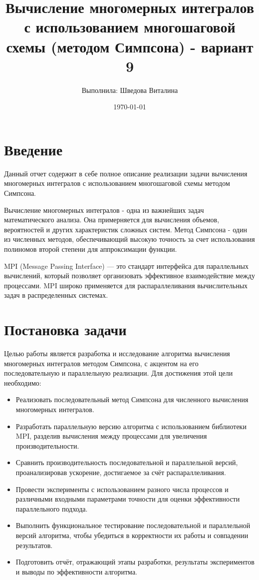 \documentclass[12pt]{article}
\title{Вычисление многомерных интегралов с использованием многошаговой схемы (методом Симпсона) - вариант 9}
\author{Выполнила: Шведова Виталина }
\date{\today}
\begin{document}
\sloppy

\maketitle

\tableofcontents
\newpage

\section*{Введение}

Данный отчет содержит в себе полное описание реализации задачи вычисления многомерных интегралов с использованием многошаговой схемы методом Симпсона.

Вычисление многомерных интегралов - одна из важнейших задач математического анализа. Она примерняется для вычисления объемов, вероятностей и других характеристик сложных систем. Метод Симпсона - один из численных методов, обеспечивающий высокую точность за счет использования полиномов второй степени для аппроксимации функции.

MPI (Message Passing Interface) — это стандарт интерфейса для параллельных вычислений, который позволяет организовать эффективное взаимодействие между процессами. MPI широко применяется для распараллеливания вычислительных задач в распределенных системах.

\section*{Постановка задачи}
Целью работы является разработка и исследование алгоритма вычисления многомерных интегралов методом Симпсона, с акцентом на его последовательную и параллельную реализации. Для достижения этой цели необходимо:
\begin{itemize}
    \item Реализовать последовательный метод Симпсона для численного вычисления многомерных интегралов.
    \item Разработать параллельную версию алгоритма с использованием библиотеки MPI, разделив вычисления между процессами для увеличения производительности.
    \item Сравнить производительность последовательной и параллельной версий, проанализировав ускорение, достигаемое за счёт распараллеливания.
    \item Провести эксперименты с использованием разного числа процессов и различными входными параметрами точности для оценки эффективности параллельного подхода.
    \item Выполнить функциональное тестирование последовательной и параллельной версий алгоритма, чтобы убедиться в корректности их работы и совпадении результатов.
    \item Подготовить отчёт, отражающий этапы разработки, результаты экспериментов и выводы по эффективности алгоритма.
\end{itemize}
\end{document}
